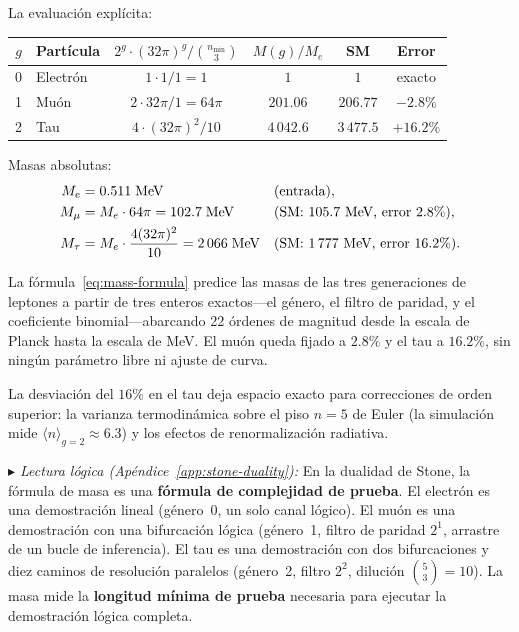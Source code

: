 \documentclass[11pt, a4paper, openany]{book}
\newcommand{\stoneref}[1]{%
  \smallskip\noindent
  {\small\color{structure!70}\textit{$\blacktriangleright$ Lectura
  l\'ogica (Ap\'endice~\ref{app:stone-duality}):} #1}%
  \smallskip}
\begin{document}
\noindent La evaluaci\'on expl\'icita:

\medskip
\begin{center}
\renewcommand{\arraystretch}{1.4}
\begin{tabular}{clcccc}
\toprule
$g$ & Part\'icula & $2^g \cdot (32\pi)^g / \binom{n_{\min}}{3}$
    & $M(g)/M_e$ & SM & Error \\
\midrule
0 & Electr\'on & $1 \cdot 1 / 1 = 1$ & $1$ & $1$ & exacto \\
1 & Mu\'on     & $2 \cdot 32\pi / 1 = 64\pi$ & $201{.}06$
    & $206{.}77$ & $-2{.}8\%$ \\
2 & Tau        & $4 \cdot (32\pi)^2 / 10$
    & $4\,042{.}6$ & $3\,477{.}5$ & $+16{.}2\%$ \\
\bottomrule
\end{tabular}
\end{center}

\medskip
\noindent Masas absolutas:
\begin{align}
  M_e &= 0{.}511\;\text{MeV} &&\text{(entrada)}, \notag\\
  M_\mu &= M_e \cdot 64\pi = 102{.}7\;\text{MeV}
    &&\text{(SM: } 105{.}7\text{ MeV, error } 2{.}8\%), \notag\\
  M_\tau &= M_e \cdot \frac{4(32\pi)^2}{10} = 2\,066\;\text{MeV}
    &&\text{(SM: } 1\,777\text{ MeV, error } 16{.}2\%).
    \label{eq:mass-predictions}
\end{align}

\begin{result}[title={La masa del lept\'on es un entero topol\'ogico}]
\label{res:mass-exact}
La f\'ormula~\eqref{eq:mass-formula} predice las masas de las tres
generaciones de leptones a partir de tres enteros exactos---el g\'enero,
el filtro de paridad, y el coeficiente binomial---abarcando 22 \'ordenes
de magnitud desde la escala de Planck hasta la escala de MeV. El mu\'on
queda fijado a $2{.}8\%$ y el tau a $16{.}2\%$, sin ning\'un par\'ametro
libre ni ajuste de curva.

La desviaci\'on del $16\%$ en el tau deja espacio exacto para
correcciones de orden superior: la varianza termodin\'amica sobre el
piso $n = 5$ de Euler (la simulaci\'on mide $\langle n \rangle_{g=2}
\approx 6{.}3$) y los efectos de renormalizaci\'on radiativa.
\end{result}

\stoneref{En la dualidad de Stone, la f\'ormula de masa es una
\textbf{f\'ormula de complejidad de prueba}. El electr\'on es una
demostraci\'on lineal (g\'enero~0, un solo canal l\'ogico). El mu\'on
es una demostraci\'on con una bifurcaci\'on l\'ogica (g\'enero~1,
filtro de paridad $2^1$, arrastre de un bucle de inferencia). El tau
es una demostraci\'on con dos bifurcaciones y diez caminos de
resoluci\'on paralelos (g\'enero~2, filtro $2^2$, diluci\'on
$\binom{5}{3} = 10$). La masa mide la \textbf{longitud m\'inima de
prueba} necesaria para ejecutar la demostraci\'on l\'ogica completa.}
\end{document}
